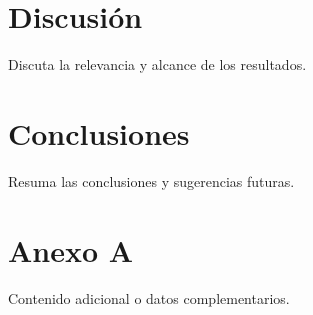 \documentclass[12pt,a4paper]{article}
\begin{document}
\section{Discusión}
Discuta la relevancia y alcance de los resultados.

\section{Conclusiones}
Resuma las conclusiones y sugerencias futuras.




\appendix
\section{Anexo A}
Contenido adicional o datos complementarios.

%
\end{document}
